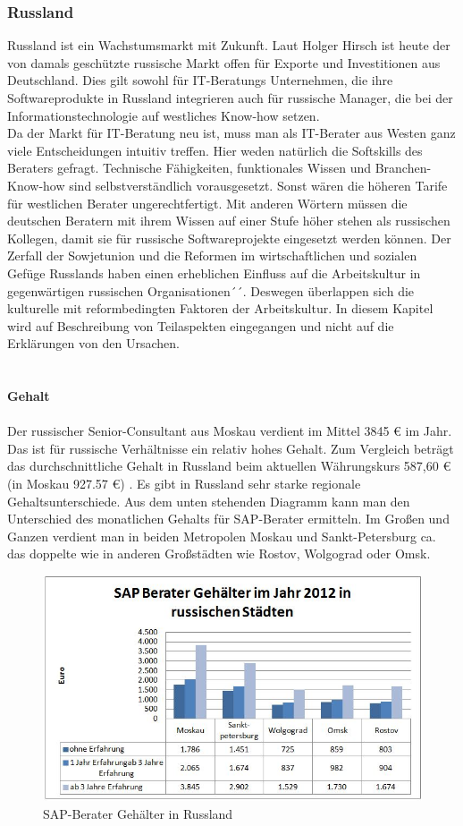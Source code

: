 	\subsubsection{Russland}
	Russland ist ein Wachstumsmarkt mit Zukunft. Laut Holger Hirsch ist heute der von damals geschützte russische Markt offen für Exporte und Investitionen aus Deutschland. Dies gilt sowohl für IT-Beratungs Unternehmen, die ihre Softwareprodukte in Russland integrieren auch für russische Manager, die bei der Informationstechnologie auf westliches Know-how setzen.\cite{ITConsRu}\\
	Da der Markt für IT-Beratung neu ist, muss man als IT-Berater aus Westen ganz viele Entscheidungen intuitiv treffen. Hier weden natürlich die Softskills des Beraters gefragt. Technische Fähigkeiten, funktionales Wissen und Branchen-Know-how sind selbstverständlich vorausgesetzt. Sonst wären die höheren Tarife für westlichen Berater ungerechtfertigt. Mit anderen Wörtern müssen die deutschen Beratern mit ihrem Wissen auf einer Stufe höher stehen als russischen Kollegen, damit sie für russische Softwareprojekte eingesetzt werden können. Der Zerfall der Sowjetunion und die Reformen im wirtschaftlichen und sozialen Gefüge Russlands haben einen erheblichen Einfluss auf die Arbeitskultur in gegenwärtigen russischen Organisationen´´\cite{ProzessbeglBerRU}.
	Deswegen überlappen sich die kulturelle mit reformbedingten Faktoren der Arbeitskultur. In diesem Kapitel wird auf Beschreibung von Teilaspekten eingegangen und nicht auf die Erklärungen von den Ursachen.\\\\ \\
	\textbf{Gehalt}\\ 
	\\
	Der russischer Senior-Consultant aus Moskau verdient im Mittel 3845 € im Jahr. Das ist für russische Verhältnisse ein relativ hohes Gehalt. Zum Vergleich beträgt das durchschnittliche Gehalt in Russland beim aktuellen Währungskurs 587,60 €(in Moskau 927.57 €) \cite{RusGehAllgm}. Es gibt in Russland sehr starke regionale Gehaltsunterschiede. Aus dem unten stehenden Diagramm kann man den Unterschied des monatlichen Gehalts für SAP-Berater ermitteln. Im Großen und Ganzen verdient man in beiden Metropolen Moskau und Sankt-Petersburg ca. das doppelte wie in anderen Großstädten wie Rostov, Wolgograd oder Omsk.
	\\
\begin{figure}[htp]
\centering
\includegraphics[width=0.7\linewidth]{./images/SAP-Berater_Gehalt_RU}
\caption{SAP-Berater Gehälter in Russland}
\label{fig:SAP-Berater_Gehalt_RU}
\end{figure}
